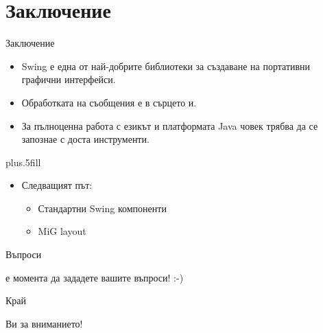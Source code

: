 \documentclass{beamer}
\begin{document}
\section*{Заключение}

\begin{frame}{Заключение}
  \transdissolve
  \begin{itemize}
  \item
    Swing е една от най-добрите библиотеки за създаване на портативни
    графични интерфейси.
  \item
    Обработката на съобщения е в сърцето и.
  \item
    За пълноценна работа с езикът и платформата Java човек трябва да
    се запознае с доста инструменти.
  \end{itemize}
  
  \vskip0pt plus.5fill
  \begin{itemize}
  \item
    Следващият път:
    \begin{itemize}
    \item
      Стандартни Swing компоненти
    \item
      MiG layout
    \end{itemize}
  \end{itemize}
\end{frame}

\begin{frame}{Въпроси}
  \transdissolve
  \begin{center}
     е момента да зададете вашите въпроси! :-)
  \end{center}
\end{frame}

\begin{frame}{Край}
  \transdissolve
  \begin{center}
     Ви за вниманието!
  \end{center}
\end{frame}
\end{document}

